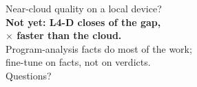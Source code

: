 \begin{frame}[standout]
  Near-cloud quality on a local device?\\[6pt]
  \textbf{Not yet: L4-D closes  of the gap,\\ $\times$ faster than the cloud.}\\[14pt]
  {\normalsize Program-analysis facts do most of the work;\\ fine-tune on facts, not on verdicts.}\\[18pt]
  Questions?
\end{frame}
